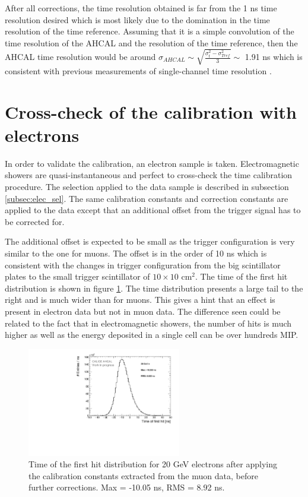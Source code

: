 After all corrections, the time resolution obtained is far from the 1 ns time resolution desired which is most likely due to the domination in the time resolution of the time reference. Assuming that it is a simple convolution of the time resolution of the AHCAL and the resolution of the time reference, then the AHCAL time resolution would be around $\sigma_{AHCAL} \sim \sqrt{\frac{\sigma_{t}^2 - \sigma_{Tref}^2}{3}} \sim$ 1.91 ns which is consistent with previous measurements of single-channel time resolution \cite{Laurien2016}.

\section{Cross-check of the calibration with electrons}
\label{subsec:validation}

In order to validate the calibration, an electron sample is taken. Electromagnetic showers are quasi-instantaneous and perfect to cross-check the time calibration procedure. The selection applied to the data sample is described in subsection \ref{subsec:elec_sel}. The same calibration constants and correction constants are applied to the data except that an additional offset from the trigger signal has to be corrected for.

The additional offset is expected to be small as the trigger configuration is very similar to the one for muons. The offset is in the order of 10 ns which is consistent with the changes in trigger configuration from the big scintillator plates to the small trigger scintillator of $10\times10$ cm$^2$. The time of the first hit distribution is shown in figure \ref{fig:Timing_electrons}. The time distribution presents a large tail to the right and is much wider than for muons. This gives a hint that an effect is present in electron data but not in muon data. The difference seen could be related to the fact that in electromagnetic showers, the number of hits is much higher as well as the energy deposited in a single cell can be over hundreds MIP.

\begin{figure}[htbp!]
	\centering
	\includegraphics[width=0.6\textwidth]{../Thesis_Plots/Timing/Electrons/Plots/Timing_AllLayers_AfterMuons.pdf}
	\caption{Time of the first hit distribution for 20 GeV electrons after applying the calibration constants extracted from the muon data, before further corrections. Max = -10.05 ns, RMS = 8.92 ns.}
	\label{fig:Timing_electrons}
\end{figure}

